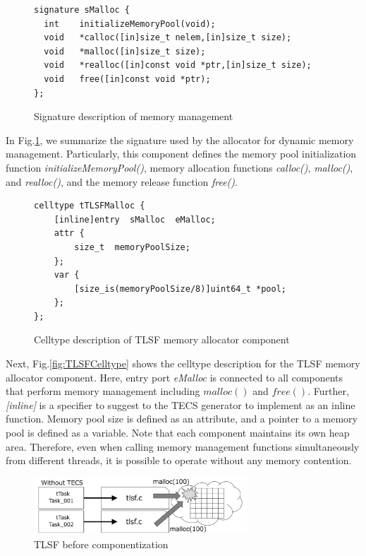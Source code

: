 \documentclass[JIP]{ipsj_v2/UTF8/ipsj}
\begin{document}
\begin{figure}[t]
\centering
\begin{lstlisting}
signature sMalloc {
  int    initializeMemoryPool(void);
  void   *calloc([in]size_t nelem,[in]size_t size);
  void   *malloc([in]size_t size);
  void   *realloc([in]const void *ptr,[in]size_t size);
  void   free([in]const void *ptr);
};
\end{lstlisting}
\caption{Signature description of memory management}  
\label{src:TLSFSignature}
\end{figure}

In Fig.\ref{src:TLSFSignature}, we summarize the signature used by the allocator for dynamic memory management.
Particularly, this component defines the memory pool initialization function {\it initializeMemoryPool()}, memory allocation functions {\it calloc()}, {\it malloc()}, and {\it realloc()}, and the memory release function {\it free()}.

\begin{figure}[t]
\centering
\begin{lstlisting}
celltype tTLSFMalloc {
    [inline]entry  sMalloc  eMalloc;
    attr {
        size_t  memoryPoolSize;
    };
    var {
        [size_is(memoryPoolSize/8)]uint64_t *pool;
    };
};
\end{lstlisting}
\caption{Celltype description of TLSF memory allocator component}  
\label{src:TLSFCelltype}
\end{figure}

Next, Fig.\ref{fig:TLSFCelltype} shows the celltype description for the TLSF memory allocator component.
Here, entry port {\it eMalloc} is connected to all components that perform memory management including $malloc()$ and $free()$.
Further, {\it [inline]} is a specifier to suggest to the TECS generator to implement as an inline function.
Memory pool size is defined as an attribute, and a pointer to a memory pool is defined as a variable.
Note that each component maintains its own heap area.
Therefore, even when calling memory management functions simultaneously from different threads, it is possible to operate without any memory contention.

\begin{figure}[t]
    \centering
    \includegraphics[width=8cm,clip]{figure/WithoutTECS.pdf}
    \caption{TLSF before componentization}
    \label{fig:WithoutTECS}
\end{figure}
\end{document}
